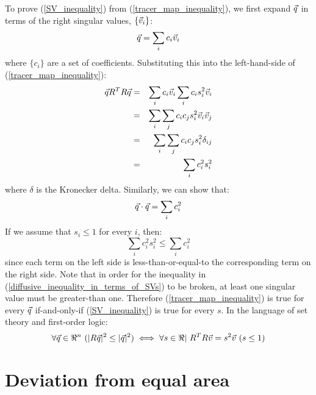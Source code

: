 To prove (\ref{SV_inequality}) from (\ref{tracer_map_inequality}), we first
expand $\vec q$ in terms of the right singular values, 
$\lbrace \vec v_i \rbrace$:
\begin{equation}
	\vec q = \sum_i c_i \vec v_i
\end{equation}
where $\lbrace c_i \rbrace$ are a set of coefficients.
Substituting this into the left-hand-side of (\ref{tracer_map_inequality}):
\begin{eqnarray}
	\vec q R^T R \vec q & = & \sum_i c_i \vec v_i \sum_i c_i s_i^2 \vec v_i \\
   & = & \sum_i \sum_j c_i c_j s_i^2 \vec v_i \vec v_j \\
   & = & \sum_i \sum_j c_i c_j s_i^2 \delta_{ij} \\
	  & = & \sum_i c_i^2 s_i^2
\end{eqnarray}
where $\delta$ is the Kronecker delta.
Similarly, we can show that:
\begin{equation}
	\vec q \cdot \vec q = \sum_i c_i^2
\end{equation}
If we assume that $s_i \le 1$ for every $i$, then:
\begin{equation}
	\sum_i c_i^2 s_i^2 \le \sum_i c_i^2 
	\label{diffusive_inequality_in_terms_of_SVs}
\end{equation}
since each term on the left side is less-than-or-equal-to the
corresponding term on the right side. 
Note that in order for the inequality in 
(\ref{diffusive_inequality_in_terms_of_SVs}) to be broken, at least one
singular value must be greater-than one.
Therefore (\ref{tracer_map_inequality}) is true for every $\vec q$
if-and-only-if (\ref{SV_inequality}) is true for every $s$.
In the language of set theory and first-order logic:
\begin{equation}
	\forall \vec q \in \Re^n ~ (| R \vec q |^2 \le |\vec q |^2) \iff \forall s \in \Re | ~R^T R \vec v = s^2 \vec v ~ (s \le 1)
	\label{theorem}
\end{equation}

\section{Deviation from equal area}

\label{equal_area}

